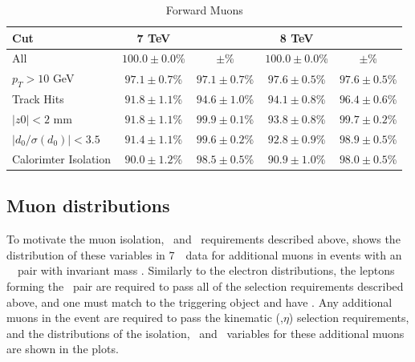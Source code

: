 \begin{table}[htbp]
\centering
\begin{tabular}{l|c|c|c|c}
\hline\hline
Cut & 7 TeV &  & 8 TeV &  \\
\hline
                          All &  $100.0 \pm 0.0$\% &         $ \pm $\% &  $100.0 \pm 0.0$\% &         $ \pm $\% \\
               $p_{T}>10$ GeV &   $97.1 \pm 0.7$\% &  $97.1 \pm 0.7$\% &   $97.6 \pm 0.5$\% &  $97.6 \pm 0.5$\% \\
                   Track Hits &   $91.8 \pm 1.1$\% &  $94.6 \pm 1.0$\% &   $94.1 \pm 0.8$\% &  $96.4 \pm 0.6$\% \\
                $|z0| < 2$ mm &   $91.8 \pm 1.1$\% &  $99.9 \pm 0.1$\% &   $93.8 \pm 0.8$\% &  $99.7 \pm 0.2$\% \\
$|d_{0}/\sigma(d_{0})| < 3.5$ &   $91.4 \pm 1.1$\% &  $99.6 \pm 0.2$\% &   $92.8 \pm 0.9$\% &  $98.9 \pm 0.5$\% \\
         Calorimter Isolation &   $90.0 \pm 1.2$\% &  $98.5 \pm 0.5$\% &   $90.9 \pm 1.0$\% &  $98.0 \pm 0.5$\% \\
\hline\hline
\end{tabular}
\caption{Forward Muons}
\end{table}


\subsection{Muon distributions}

To motivate the muon isolation, \dzerosig\ and \zzero\ requirements described
above,  shows the distribution of these variables in 7~\tev\ data for additional
muons in events with an \ossf\ \dilepton\ pair with invariant mass \sstooos.
Similarly to the electron distributions, the leptons forming the \dilepton\ pair are required to pass all of
the selection requirements described above, and one must match to the triggering
object and have . Any additional muons in the event are required to pass
the kinematic (\pt,$\eta$) selection requirements, and the distributions of the isolation, \dzerosig\ and \zzero\
variables for these additional muons are shown in the plots. 

